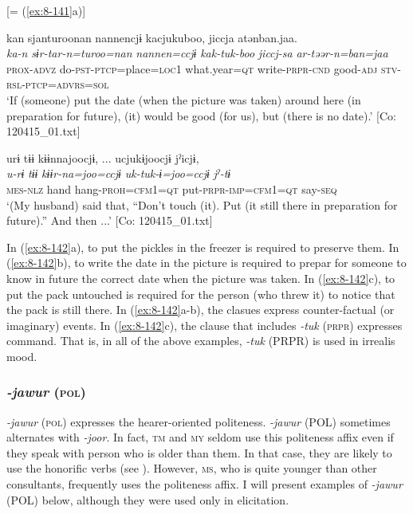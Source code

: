 \ex{} [= (\ref{ex:8-141}a)]

{\TM}
\glll  kan  sjanturoonan  {\textbar}nannen{\textbar}cjɨ  kacjukuboo,     jiccja  atənban.jaa.  \\
\textit{ka-n}  \textit{sɨr-tar-n=turoo=nan}  \textit{nannen=ccjɨ}  \textit{kak-tuk-boo}      \textit{jiccj-sa}  \textit{ar-təər-n=ban=jaa}  \\
\textsc{prox}-\textsc{advz}  do-\textsc{pst}-\textsc{ptcp}=place=\textsc{loc}1  what.year=\textsc{qt}  write-\textsc{prpr}-\textsc{cnd}  good-\textsc{adj}  \textsc{stv}-\textsc{rsl}-\textsc{ptcp}=\textsc{advrs}=\textsc{sol}\\
\glt ‘If (someone) put the date (when the picture was taken) around here (in preparation for future), (it) would be good (for us), but (there is no date).’ [Co: 120415\_01.txt]


{\TM}
\glll  urɨ  tɨɨ  kɨɨnnajoocjɨ, ...  ucjukɨjoocjɨ      jˀicjɨ,      \\
\textit{u-rɨ}  \textit{tɨɨ}  \textit{kɨɨr-na=joo=ccjɨ}  \textit{uk-tuk-ɨ=joo=ccjɨ}     \textit{jˀ-tɨ}      \\
\textsc{mes}-\textsc{nlz}  hand  hang-\textsc{proh}=\textsc{cfm1}=\textsc{qt}  put-\textsc{prpr}-\textsc{imp}=\textsc{cfm1}=\textsc{qt}  say-\textsc{seq}\\
\glt ‘(My husband) said that, “Don’t touch (it). Put (it still there in preparation for future).” And then ...’ [Co: 120415\_01.txt]
\z
\z

In (\ref{ex:8-142}a), to put the pickles in the freezer is required to preserve them. In (\ref{ex:8-142}b), to write the date in the picture is required to prepar for someone to know in future the correct date when the picture was taken. In (\ref{ex:8-142}c), to put the pack untouched is required for the person (who threw it) to notice that the pack is still there. In (\ref{ex:8-142}a-b), the clasues express counter-factual (or imaginary) events. In (\ref{ex:8-142}c), the clause that includes \textit{-tuk} (\textsc{prpr}) expresses command. That is, in all of the above examples, \textit{-tuk} (PRPR) is used in irrealis mood.

\subsubsection{\textit{-jawur} (\textsc{pol})}

\textit{-jawur} (\textsc{pol}) expresses the hearer-oriented politeness. \textit{-jawur} (POL) sometimes alternates with \textit{-joor}. In fact, \textsc{tm} and \textsc{my} seldom use this politeness affix even if they speak with person who is older than them. In that case, they are likely to use the honorific verbs (see ). However, \textsc{ms}, who is quite younger than other consultants, frequently uses the politeness affix. I will present examples of \textit{-jawur} (POL) below, although they were used only in elicitation.

